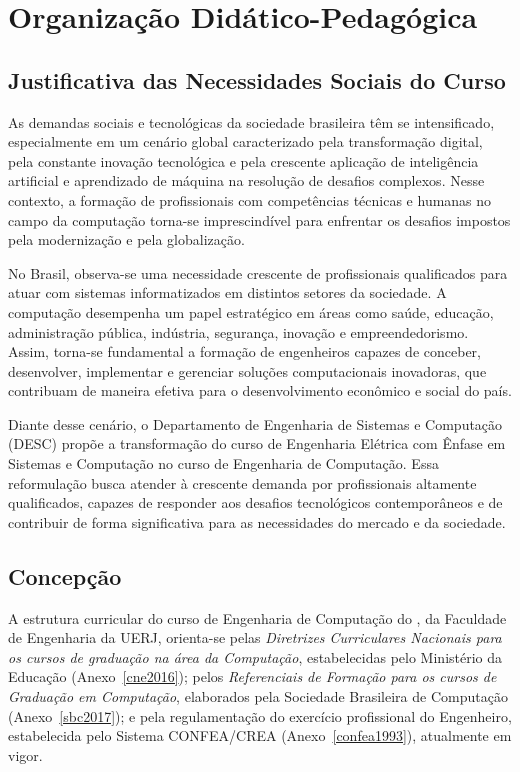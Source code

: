 \chapter{Organização Didático-Pedagógica}
\thispagestyle{plain}

\section{Justificativa das Necessidades Sociais do Curso}

As demandas sociais e tecnológicas da sociedade brasileira têm se intensificado, especialmente em um cenário global caracterizado pela transformação digital, pela constante inovação tecnológica e pela crescente aplicação de inteligência artificial e aprendizado de máquina na resolução de desafios complexos. Nesse contexto, a formação de profissionais com competências técnicas e humanas no campo da computação torna-se imprescindível para enfrentar os desafios impostos pela modernização e pela globalização.

No Brasil, observa-se uma necessidade crescente de profissionais qualificados para atuar com sistemas informatizados em distintos setores da sociedade. A computação desempenha um papel estratégico em áreas como saúde, educação, administração pública, indústria, segurança, inovação e empreendedorismo. Assim, torna-se fundamental a formação de engenheiros capazes de conceber, desenvolver, implementar e gerenciar soluções computacionais inovadoras, que contribuam de maneira efetiva para o desenvolvimento econômico e social do país.

Diante desse cenário, o Departamento de Engenharia de Sistemas e Computação (DESC) propõe a transformação do curso de Engenharia Elétrica com Ênfase em Sistemas e Computação no curso de Engenharia de Computação. Essa reformulação busca atender à crescente demanda por profissionais altamente qualificados, capazes de responder aos desafios tecnológicos contemporâneos e de contribuir de forma significativa para as necessidades do mercado e da sociedade.

\section{Concepção}

A estrutura curricular do curso de Engenharia de Computação do \desc, da Faculdade de Engenharia da UERJ, orienta-se pelas \textit{Diretrizes Curriculares Nacionais para os cursos de graduação na área da Computação}, estabelecidas pelo Ministério da Educação (Anexo~\ref{cne2016}); pelos \textit{Referenciais de Formação para os cursos de Graduação em Computação}, elaborados pela Sociedade Brasileira de Computação (Anexo~\ref{sbc2017}); e pela regulamentação do exercício profissional do Engenheiro, estabelecida pelo Sistema CONFEA/CREA (Anexo~\ref{confea1993}), atualmente em vigor.

